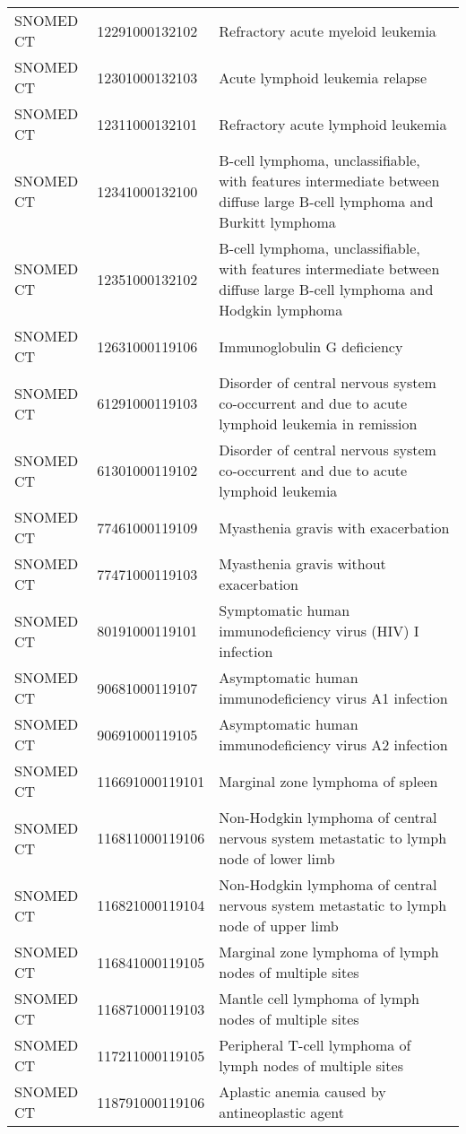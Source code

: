 \begin{table}[ht]
\begin{tabular}{lll}
  SNOMED CT & 12291000132102 & Refractory acute myeloid leukemia \\ 
  SNOMED CT & 12301000132103 & Acute lymphoid leukemia relapse \\ 
  SNOMED CT & 12311000132101 & Refractory acute lymphoid leukemia \\ 
  SNOMED CT & 12341000132100 & B-cell lymphoma, unclassifiable, with features intermediate between diffuse large B-cell lymphoma and Burkitt lymphoma \\ 
  SNOMED CT & 12351000132102 & B-cell lymphoma, unclassifiable, with features intermediate between diffuse large B-cell lymphoma and Hodgkin lymphoma \\ 
  SNOMED CT & 12631000119106 & Immunoglobulin G deficiency \\ 
  SNOMED CT & 61291000119103 & Disorder of central nervous system co-occurrent and due to acute lymphoid leukemia in remission \\ 
  SNOMED CT & 61301000119102 & Disorder of central nervous system co-occurrent and due to acute lymphoid leukemia \\ 
  SNOMED CT & 77461000119109 & Myasthenia gravis with exacerbation \\ 
  SNOMED CT & 77471000119103 & Myasthenia gravis without exacerbation \\ 
  SNOMED CT & 80191000119101 & Symptomatic human immunodeficiency virus (HIV) I infection \\ 
  SNOMED CT & 90681000119107 & Asymptomatic human immunodeficiency virus A1 infection \\ 
  SNOMED CT & 90691000119105 & Asymptomatic human immunodeficiency virus A2 infection \\ 
  SNOMED CT & 116691000119101 & Marginal zone lymphoma of spleen \\ 
  SNOMED CT & 116811000119106 & Non-Hodgkin lymphoma of central nervous system metastatic to lymph node of lower limb \\ 
  SNOMED CT & 116821000119104 & Non-Hodgkin lymphoma of central nervous system metastatic to lymph node of upper limb \\ 
  SNOMED CT & 116841000119105 & Marginal zone lymphoma of lymph nodes of multiple sites \\ 
  SNOMED CT & 116871000119103 & Mantle cell lymphoma of lymph nodes of multiple sites \\ 
  SNOMED CT & 117211000119105 & Peripheral T-cell lymphoma of lymph nodes of multiple sites \\ 
  SNOMED CT & 118791000119106 & Aplastic anemia caused by antineoplastic agent \\ 

\end{tabular}
\end{table}
